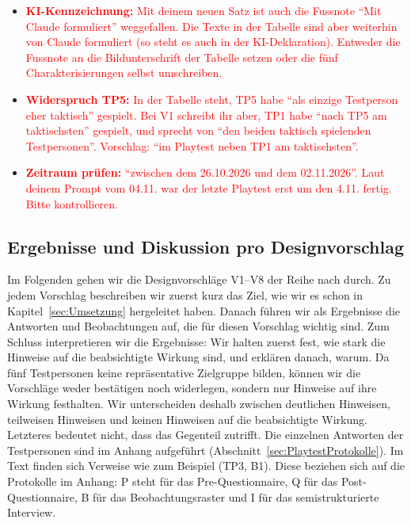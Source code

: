 \documentclass[../Main.tex]{subfiles}
\begin{document}
\begin{itemize}[leftmargin=1.5cm]
    \item \textcolor{red}{\textbf{KI-Kennzeichnung:} Mit deinem neuen Satz ist auch die Fussnote \enquote{Mit Claude formuliert} weggefallen. Die Texte in der Tabelle sind aber weiterhin von Claude formuliert (so steht es auch in der KI-Deklaration). Entweder die Fussnote an die Bildunterschrift der Tabelle setzen oder die fünf Charakterisierungen selbst umschreiben.}
    \item \textcolor{red}{\textbf{Widerspruch TP5:} In der Tabelle steht, TP5 habe \enquote{als einzige Testperson eher taktisch} gespielt. Bei V1 schreibt ihr aber, TP1 habe \enquote{nach TP5 am taktischsten} gespielt, und sprecht von \enquote{den beiden taktisch spielenden Testpersonen}. Vorschlag: \enquote{im Playtest neben TP1 am taktischsten}.}
    \item \textcolor{red}{\textbf{Zeitraum prüfen:} \enquote{zwischen dem 26.10.2026 und dem 02.11.2026}. Laut deinem Prompt vom 04.11. war der letzte Playtest erst um den 4.11. fertig. Bitte kontrollieren.}
\end{itemize}

\subsection{Ergebnisse und Diskussion pro Designvorschlag} \label{sec:ErgVorschlag} \label{sec:Interpretation}

Im Folgenden gehen wir die Designvorschläge V1--V8 der Reihe nach durch. Zu jedem Vorschlag beschreiben wir zuerst kurz das Ziel, wie wir es schon in Kapitel~\ref{sec:Umsetzung} hergeleitet haben. Danach führen wir als Ergebnisse die Antworten und Beobachtungen auf, die für diesen Vorschlag wichtig sind. Zum Schluss interpretieren wir die Ergebnisse: Wir halten zuerst fest, wie stark die Hinweise auf die beabsichtigte Wirkung sind, und erklären danach, warum. Da fünf Testpersonen keine repräsentative Zielgruppe bilden, können wir die Vorschläge weder bestätigen noch widerlegen, sondern nur Hinweise auf ihre Wirkung festhalten. Wir unterscheiden deshalb zwischen deutlichen Hinweisen, teilweisen Hinweisen und keinen Hinweisen auf die beabsichtigte Wirkung. Letzteres bedeutet nicht, dass das Gegenteil zutrifft. Die einzelnen Antworten der Testpersonen sind im Anhang aufgeführt (Abschnitt~\ref{sec:PlaytestProtokolle}). Im Text finden sich Verweise wie zum Beispiel (TP3, B1). Diese beziehen sich auf die Protokolle im Anhang: P steht für das Pre-Questionnaire, Q für das Post-Questionnaire, B für das Beobachtungsraster und I für das semistrukturierte Interview.
\end{document}
